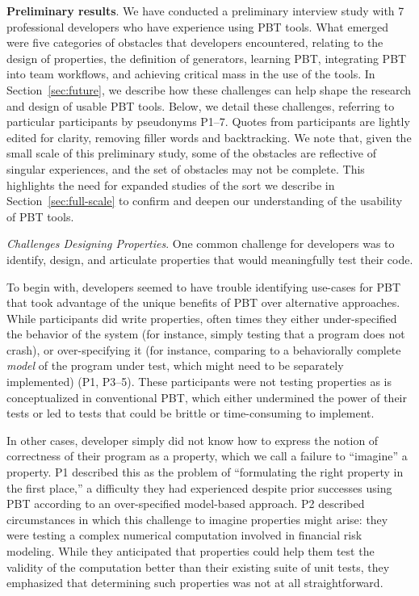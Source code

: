 \textbf{Preliminary results}.
We have conducted a preliminary interview study with 7 professional developers
who have experience using PBT tools.
What emerged were five categories of obstacles that developers encountered, 
relating
to the design of properties, the definition of generators, learning PBT,
integrating PBT into team workflows, and achieving critical mass in the use of the tools.
In Section~\ref{sec:future}, we describe how these challenges
can help shape the research and design of usable PBT tools.
Below, we detail these challenges, referring to particular participants by
pseudonyms P1--7. Quotes from participants are lightly edited for clarity,
removing filler words and backtracking.
We note that, given the small scale of this preliminary study, some
of the obstacles are reflective of singular experiences, and the set of
obstacles may not be complete. This
highlights the need for expanded
studies of the sort we describe in Section~\ref{sec:full-scale} to confirm
and deepen our understanding of the usability of PBT tools.

\textit{Challenges Designing Properties}.
One common challenge for developers was to identify, design,
and articulate properties that would meaningfully test their code.

To begin with, developers seemed to have trouble identifying use-cases for PBT
that took advantage of the unique benefits of PBT over alternative approaches. While participants
did write properties, often times they either under-specified the
behavior of the system (for instance, simply testing that a program does not crash),
or over-specifying it (for instance, comparing to a behaviorally complete
{\em model} of the program under test, which might need to be separately
implemented) (P1, P3--5).
These participants were not testing properties as is conceptualized
in conventional PBT, which either undermined the power of their tests or
led to tests that could be brittle or time-consuming to implement.

In other cases, developer simply did not know how to express the notion of
correctness of their program as a property, which we call a failure
to ``imagine'' a property.
P1 described this as the problem of ``formulating the right property in the first place,''
a difficulty they had experienced despite prior successes using PBT according to
an over-specified model-based approach. P2 described circumstances in which this
challenge to imagine properties might arise: they were testing a complex numerical
computation involved in financial risk modeling. While they anticipated that
properties could help them test the validity of the computation better than their
existing suite of unit tests, they emphasized that determining such properties
was not at all straightforward.

